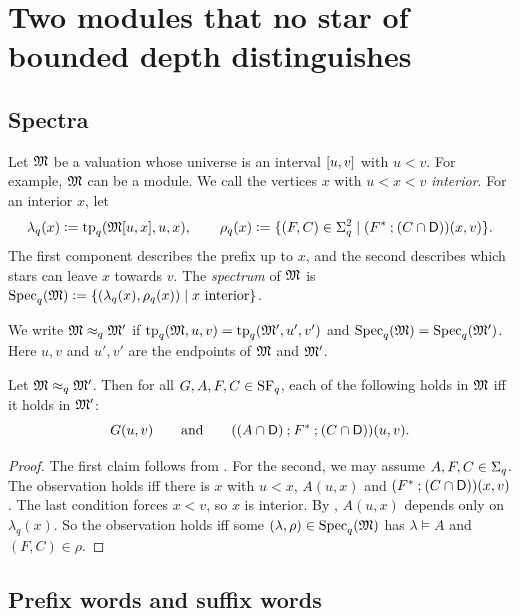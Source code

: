 \section{Two modules that no star of bounded depth distinguishes}\label{section: local}

\subsection{Spectra}

Let $\mathfrak{M}$ be a valuation whose universe is an interval $[u, v]$ with $u < v$.
For example, $\mathfrak{M}$ can be a module.
We call the vertices $x$ with $u < x < v$ \emph{interior}.
For an interior $x$, let
\[
  \lambda_q(x) \mathrel{\vcentcolon=} \mathrm{tp}_{q}(\mathfrak{M}[u, x], u, x),
  \qquad
  \rho_q(x) \mathrel{\vcentcolon=} \{(F, C) \in \Sigma_{q}^{2} \mid (F^{*} \mathbin{;} (C \cap \mathsf{D}))(x, v)\}.
\]
The first component describes the prefix up to $x$, and the second describes which stars can leave $x$ towards $v$.
The \emph{spectrum} of $\mathfrak{M}$ is $\mathrm{Spec}_{q}(\mathfrak{M}) \mathrel{\vcentcolon=} \{(\lambda_q(x), \rho_q(x)) \mid x \text{ interior}\}$.

\begin{definition}\label{definition: local equivalence}
  We write $\mathfrak{M} \approx_{q} \mathfrak{M}'$ if $\mathrm{tp}_{q}(\mathfrak{M}, u, v) = \mathrm{tp}_{q}(\mathfrak{M}', u', v')$ and $\mathrm{Spec}_{q}(\mathfrak{M}) = \mathrm{Spec}_{q}(\mathfrak{M}')$.
  Here $u, v$ and $u', v'$ are the endpoints of $\mathfrak{M}$ and $\mathfrak{M}'$.
\end{definition}

\begin{lemma}[Spectrum]\label{lemma: spectrum}
  Let $\mathfrak{M} \approx_{q} \mathfrak{M}'$.
  Then for all $G, A, F, C \in \mathrm{SF}_{q}$, each of the following holds in $\mathfrak{M}$ iff it holds in $\mathfrak{M}'$:
  \[
    G(u, v) \qquad\text{and}\qquad ((A \cap \mathsf{D}) \mathbin{;} F^{*} \mathbin{;} (C \cap \mathsf{D}))(u, v).
  \]
\end{lemma}
\begin{proof}
  The first claim follows from .
  For the second, we may assume $A, F, C \in \Sigma_{q}$.
  The observation holds iff there is $x$ with $u < x$, $A(u, x)$ and $(F^{*} \mathbin{;} (C \cap \mathsf{D}))(x, v)$.
  The last condition forces $x < v$, so $x$ is interior.
  By , $A(u, x)$ depends only on $\lambda_q(x)$.
  So the observation holds iff some $(\lambda, \rho) \in \mathrm{Spec}_{q}(\mathfrak{M})$ has $\lambda \models A$ and $(F, C) \in \rho$.
\end{proof}

\subsection{Prefix words and suffix words}

